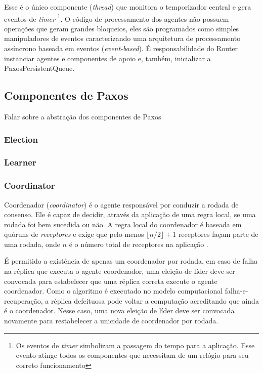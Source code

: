 Esse é o único componente (\emph{thread}) que monitora o temporizador central e gera
eventos de \emph{timer} \footnote{Os eventos de \emph{timer} simbolizam a passagem do
tempo para a aplicação. Esse evento atinge todos os componentes que necessitam de um
relógio para seu correto funcionamento}. O código de processamento dos agentes não possuem
operações que geram grandes bloqueios, eles são programados como simples manipuladores de
eventos caracterizando uma arquitetura de processamento assíncrono baseada em eventos
(\emph{event-based}). É responsabilidade do Router instanciar agentes e componentes de
apoio e, também, inicializar a PaxosPersistentQueue.


\subsection{Componentes de Paxos}

Falar sobre a abstração dos componentes de Paxos

\subsubsection{Election}

\subsubsection{Learner}

\subsubsection{Coordinator}

Coordenador (\emph{coordinator}) é o agente responsável por conduzir a rodada de consenso.
Ele é capaz de decidir, através da aplicação de uma regra local, se uma rodada foi bem
sucedida ou não. A regra local do coordenador é baseada em quóruns de \emph{receptores} e
exige que pelo menos $\lfloor n/2 \rfloor + 1$ receptores façam parte de uma rodada, onde
$n$ é o número total de receptores na aplicação \cite{lamport98}.

É permitido a existência de apenas um coordenador por rodada, em caso de falha na réplica
que executa o agente coordenador, uma eleição de líder deve ser convocada para estabelecer
que uma réplica correta execute o agente coordenador. Como o algoritmo é executado no
modelo computacional falha-e-recuperação, a réplica defeituosa pode voltar a computação
acreditando que ainda é o coordenador. Nesse caso, uma nova eleição de líder deve ser
convocada novamente para restabelecer a unicidade de coordenador por rodada.

